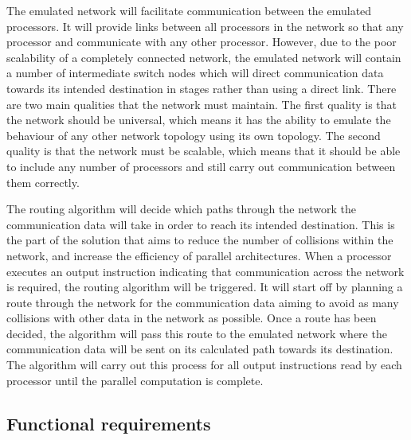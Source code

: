\documentclass[a4paper, 12pt]{article}
\begin{document}
The emulated network will facilitate communication between the emulated processors. It will provide links between all processors in the network so that any processor and communicate with any other processor. However, due to the poor scalability of a completely connected network, the emulated network will contain a number of intermediate switch nodes which will direct communication data towards its intended destination in stages rather than using a direct link. There are two main qualities that the network must maintain. The first quality is that the network should be universal, which means it has the ability to emulate the behaviour of any other network topology using its own topology. The second quality is that the network must be scalable, which means that it should be able to include any number of processors and still carry out communication between them correctly.

The routing algorithm will decide which paths through the network the communication data will take in order to reach its intended destination. This is the part of the solution that aims to reduce the number of collisions within the network, and increase the efficiency of parallel architectures. When a processor executes an output instruction indicating that communication across the network is required, the routing algorithm will be triggered. It will start off by planning a route through the network for the communication data aiming to avoid as many collisions with other data in the network as possible. Once a route has been decided, the algorithm will pass this route to the emulated network where the communication data will be sent on its calculated path towards its destination. The algorithm will carry out this process for all output instructions read by each processor until the parallel computation is complete.

\subsection{Functional requirements}
\label{sec:req_func}
\end{document}
